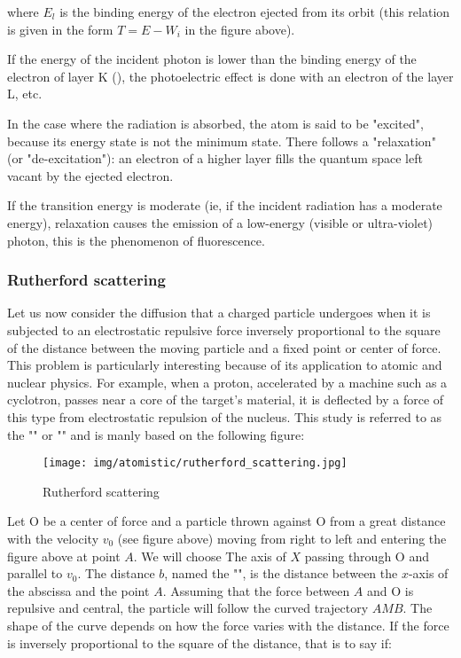 	where $E_l$ is the binding energy of the electron ejected from its orbit (this relation is given in the form $T=E-W_i$ in the figure above).
	
	If the energy of the incident photon is lower than the binding energy of the electron of layer K (), the photoelectric effect is done with an electron of the layer L, etc.

In the case where the radiation is absorbed, the atom is said to be "excited", because its energy state is not the minimum state. There follows a "relaxation" (or "de-excitation"): an electron of a higher layer fills the quantum space left vacant by the ejected electron.

	If the transition energy is moderate (ie, if the incident radiation has a moderate energy), relaxation causes the emission of a low-energy (visible or ultra-violet) photon, this is the phenomenon of fluorescence. 
	
	\pagebreak
	\subsubsection{Rutherford scattering}
	Let us now consider the diffusion that a charged particle undergoes when it is subjected to an electrostatic repulsive force inversely proportional to the square of the distance between the moving particle and a fixed point or center of force. This problem is particularly interesting because of its application to atomic and nuclear physics. For example, when a proton, accelerated by a machine such as a cyclotron, passes near a core of the target's material, it is deflected by a force of this type from electrostatic repulsion of the nucleus. This study is referred to as the "" or "" and is manly based on the following figure:
	\begin{figure}[H]
		\centering
		\texttt{[image: img/atomistic/rutherford\_scattering.jpg]}
		\caption{Rutherford scattering}
	\end{figure}
	Let O be a center of force and a particle thrown against O from a great distance with the velocity $v_0$ (see figure above) moving from right to left and entering the figure above at point $A$. We will choose The axis of $X$ passing through O and parallel to $v_0$. The distance $b$, named the "", is the distance between the $x$-axis of the abscissa and the point $A$. Assuming that the force between $A$ and O is repulsive and central, the particle will follow the curved trajectory $AMB$. The shape of the curve depends on how the force varies with the distance. If the force is inversely proportional to the square of the distance, that is to say if:
	
